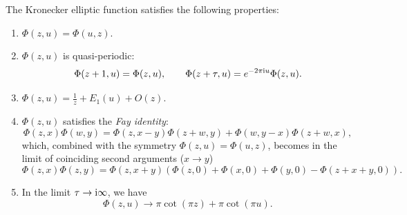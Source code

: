 \begin{lemma}
	The Kronecker elliptic function satisfies the following properties:
	\begin{enumerate}[label=(\roman*)]
		\item $\Phi(z,u) = \Phi(u,z)$.
		\item $\Phi(z,u)$ is quasi-periodic:
		\begin{equation}
    		\Phi(z+1,u) = \Phi(z,u), \qquad \Phi(z+\tau,u) = e^{-2\pi\mathrm{i} u} \Phi(z,u).
		\end{equation}
    	\item $\Phi(z,u) = \frac{1}{z} + E_1(u) + O(z)$.
    	\item $\Phi(z,u)$ satisfies the \emph{Fay identity}:
    	\begin{equation}
			\Phi(z,x) \Phi(w,y) = \Phi(z,x-y) \Phi(z+w,y) + \Phi(w,y-x) \Phi(z+w,x),
		\end{equation}
		which, combined with the symmetry $\Phi(z,u) = \Phi(u,z)$, becomes in the limit of coinciding second arguments ($x \to y$)
		\begin{equation}
			\Phi(z,x) \Phi(z,y) = \Phi(z,x+y)(\Phi(z,0) + \Phi(x,0) + \Phi(y,0) - \Phi(z+x+y,0)).
		\end{equation}
		\item In the limit $\tau \to \mathrm{i} \infty$, we have
		\begin{equation}
			\Phi(z,u) \to \pi \cot(\pi z) + \pi \cot(\pi u).
		\end{equation}
	\end{enumerate}
\end{lemma}